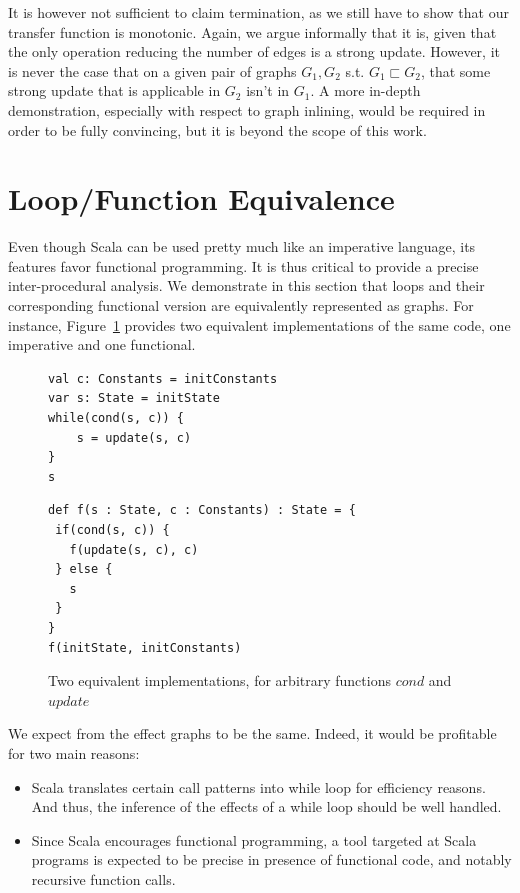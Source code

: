 It is however not sufficient to claim termination, as we still have to show
that our transfer function is monotonic. Again, we argue informally that it is,
given that the only operation reducing the number of edges is a strong update.
However, it is never the case that on a given pair of graphs $G_1, G_2$ s.t.
$G_1 \sqsubset G_2$, that some strong update that is applicable in $G_2$ isn't
in $G_1$. A more in-depth demonstration, especially with respect to graph
inlining, would be required in order to be fully convincing, but it is beyond
the scope of this work.

\section{Loop/Function Equivalence}
Even though Scala can be used pretty much like an imperative language, its
features favor functional programming. It is thus critical to provide
a precise inter-procedural analysis. We demonstrate in this section that
loops and their corresponding functional version are equivalently represented
as graphs. For instance, Figure~\ref{fig:equiv:code} provides two equivalent
implementations of the same code, one imperative and one functional.

\begin{figure}[h]
\begin{minipage}[t]{0.5\linewidth}
    \centering
\begin{lstlisting}
val c: Constants = initConstants
var s: State = initState
while(cond(s, c)) {
    s = update(s, c)
}
s
\end{lstlisting}
\end{minipage}
\begin{minipage}[t]{0.5\linewidth}
    \centering
\begin{lstlisting}
def f(s : State, c : Constants) : State = {
 if(cond(s, c)) {
   f(update(s, c), c)
 } else {
   s
 }
}
f(initState, initConstants)
\end{lstlisting}
\end{minipage}
    \caption{Two equivalent implementations, for arbitrary functions $cond$ and $update$}
    \label{fig:equiv:code}
\end{figure}

We expect from the effect graphs to be the same. Indeed, it would be profitable
for two main reasons:
\begin{itemize}
    \item Scala translates certain call patterns into while loop for
efficiency reasons. And thus, the inference of the effects of a while loop
should be well handled.

    \item Since Scala encourages functional programming, a tool targeted at
Scala programs is expected to be precise in presence of functional code, and
notably recursive function calls.
\end{itemize}

